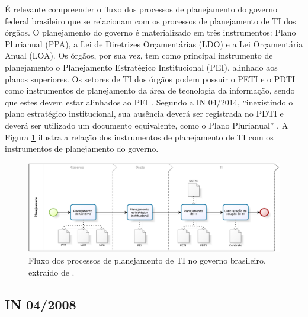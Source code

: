 É relevante compreender o fluxo dos processos de planejamento do governo federal brasileiro que se relacionam com os processos de planejamento de TI dos órgãos. O planejamento do governo é materializado em três instrumentos: Plano Plurianual (PPA), a Lei de Diretrizes Orçamentárias (LDO) e a Lei Orçamentária Anual (LOA). Os órgãos, por sua vez, tem como principal instrumento de planejamento o Planejamento Estratégico Institucional (PEI), alinhado aos planos superiores. Os setores de TI dos órgãos podem possuir o PETI e o PDTI como instrumentos de planejamento da área de tecnologia da informação, sendo que estes devem estar alinhados ao PEI \cite{sisp:15}. Segundo a IN 04/2014, ``inexistindo o plano estratégico institucional, sua ausência deverá ser registrada no PDTI e deverá ser utilizado um documento equivalente, como o Plano Plurianual'' \cite{in04:14}. A Figura \ref{figura:fluxoPlanejamentoGov} ilustra a relação dos instrumentos de planejamento de TI com os instrumentos de planejamento do governo.

\begin{figure}[h!]
\centering %
\includegraphics[width=14cm]{figuras/fluxoPlanejamentoGov.png}
\caption{Fluxo dos processos de planejamento de TI no governo brasileiro, extraído de .}
\label{figura:fluxoPlanejamentoGov}
\end{figure}

\subsection{IN 04/2008}

